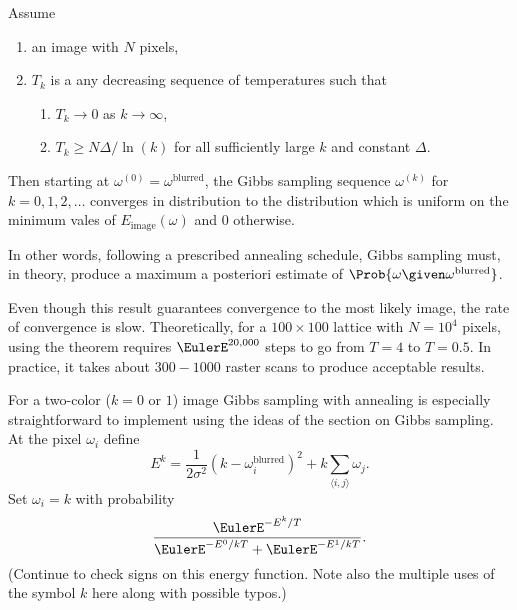 \documentclass[12pt]{article}
\begin{document}
\begin{theorem}
    Assume
    \begin{enumerate}
        \item
            an image with \( N \) pixels,
        \item
            \( T_k \) is a any decreasing sequence of temperatures such
            that
            \begin{enumerate}
                \item
                    \( T_k \to 0 \) as \( k \to \infty \),
                \item
                    \( T_k \ge N \Delta/\ln(k) \) for all sufficiently
                    large \( k \) and constant \( \Delta \).
            \end{enumerate}
    \end{enumerate}
    Then starting at \( \omega^{(0)} = \omega^{\text{blurred}} \), the
    Gibbs sampling sequence \( \omega^{(k)} \) for \( k=0,1,2, \dots \)
    converges in distribution to the distribution which is uniform on
    the minimum vales of \( E_{\text{image}}(\omega) \) and \( 0 \)
    otherwise.
\end{theorem}

In other words, following a prescribed annealing schedule, Gibbs
sampling must, in theory, produce a maximum a posteriori estimate of \(
\Prob{\omega \given \omega^{\text{blurred}}} \).

Even though this result guarantees convergence to the most likely image,
the rate of convergence is slow.  Theoretically, for a \( 100 \times 100
\) lattice with \( N = 10^4 \) pixels, using the theorem requires \(
\EulerE^{20{,}000} \) steps to go from \( T = 4 \) to \( T = 0.5 \).  In
practice, it takes about \( 300 - 1000 \) raster scans to produce
acceptable results.

For a two-color (\( k = 0 \) or \( 1 \)) image Gibbs sampling with
annealing is especially straightforward to implement using the ideas of
the section on Gibbs sampling.  At the pixel \( \omega_i \) define
\[
    E^k = \frac{1}{2 \sigma^2}( k - \omega_i^{\text{blurred}})^2 + k
    \sum\limits_{\langle i,j\rangle} \omega_j.
\] Set \( \omega_i = k \) with probability
\[
    \frac{\EulerE^{-E^k/T}}{\EulerE^{-E^0/kT} + \EulerE^{-E^1/kT}}.
\] (Continue to check signs on this energy function.  Note also the
multiple uses of the symbol \( k \) here along with possible typos.)

\end{document}
